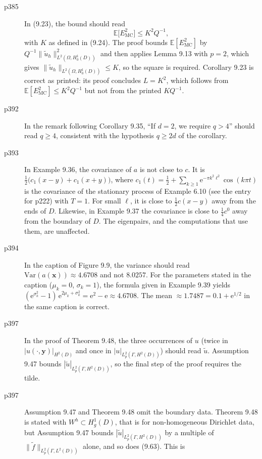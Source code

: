 \documentclass[final]{article}
\theoremstyle{definition}
\newcommand{\vecbs}[1]{\boldsymbol{#1}}
\renewcommand{\vec}[1]{{\vecbs{#1}}}
\begin{document}
\begin{enumerate}
\begin{description}
   \item[p385] In (9.23), the bound should read
\[
\mathbb{E}\bigl[E_{\mathrm{MC}}^{2}\bigr] \le K^{2} Q^{-1},
\]
with $K$ as defined in (9.24). The proof bounds $\mathbb{E}[E_{\mathrm{MC}}^{2}]$
by $Q^{-1}\|\tilde{u}_{h}\|_{L^{2}(\Omega, H_{0}^{1}(D))}^{2}$ and then applies
Lemma 9.13 with $p=2$, which gives
$\|\tilde{u}_{h}\|_{L^{2}(\Omega, H_{0}^{1}(D))} \le K$, so the square is
required. Corollary 9.23 is correct as printed: its proof concludes $L=K^{2}$,
which follows from $\mathbb{E}[E_{\mathrm{MC}}^{2}] \le K^{2}Q^{-1}$ but not from
the printed $KQ^{-1}$.
   \item[p392] In the remark following Corollary 9.35, ``If $d=2$, we
require $q>4$'' should read $q \ge 4$, consistent with the hypothesis $q \ge 2d$
of the corollary.
   \item[p393] In Example 9.36, the covariance of $a$ is not close to $c$. It is
$\frac12\bigl(c_1(x-y)+c_1(x+y)\bigr)$, where
$c_1(t)=\frac12+\sum_{k\ge1}\mathrm{e}^{-\pi k^2\ell^2}\cos(k\pi t)$ is the
covariance of the stationary process of Example 6.10 (see the entry for p222)
with $T=1$. For small $\ell$, it is close to $\frac12c(x-y)$ away from the ends
of $D$. Likewise, in Example 9.37 the covariance is close to $\frac14c^0$ away
from the boundary of $D$. The eigenpairs, and the computations that use them,
are unaffected.
   \item[p394] In the caption of Figure 9.9, the variance should read
$\mathrm{Var}(a(\vec{x})) \approx 4.6708$ and not $8.0257$. For the parameters
stated in the caption ($\mu_{k}=0$, $\sigma_{k}=1$), the formula given in
Example 9.39 yields
$(\mathrm{e}^{\sigma_{k}^{2}}-1)\,\mathrm{e}^{2\mu_{k}+\sigma_{k}^{2}}
= \mathrm{e}^{2}-\mathrm{e} \approx 4.6708$. The mean
$\approx 1.7487 = 0.1 + \mathrm{e}^{1/2}$ in the same caption is correct.
   \item[p397] In the proof of Theorem 9.48, the three occurrences of $u$ (twice in $|u(\cdot,\vec{y})|_{H^{2}(D)}$ and once in
$|u|_{L_{p}^{2}(\Gamma,H^{2}(D))}$) should read $\tilde{u}$. Assumption 9.47
bounds $|\tilde{u}|_{L_{p}^{2}(\Gamma,H^{2}(D))}$, so the final step of the
proof requires the tilde.
   \item[p397] Assumption 9.47 and Theorem 9.48 omit the boundary data.
Theorem 9.48 is stated with $W^{h} \subset H_{g}^{1}(D)$, that is for
non-homogeneous Dirichlet data, but Assumption 9.47 bounds
$|\tilde{u}|_{L_{p}^{2}(\Gamma,H^{2}(D))}$ by a multiple of
$\|\tilde{f}\|_{L_{p}^{2}(\Gamma,L^{2}(D))}$ alone, and so does (9.63). This is

\end{description}
\end{enumerate}
\end{document}
